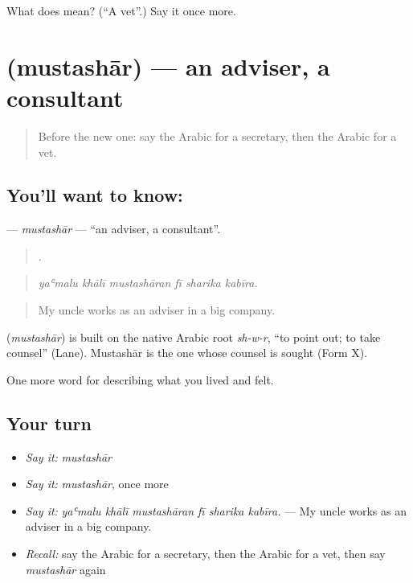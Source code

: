 \begin{tcolorbox}[breakable,colback=teal!4,colframe=teal!35!black,title={Before you move on}]
What does  mean? (\textquotedblleft{}A vet\textquotedblright{}.) Say it once more.
\end{tcolorbox}
\section[\texorpdfstring{\ar{مستشار} (mustashār)}{مستشار (mustashār)}]{ (mustashār) — an adviser, a consultant}

\label{lesson:AR-C518-mustashar}



\begin{quote}
Before the new one: say the Arabic for a secretary, then the Arabic for a vet.
\end{quote}

\subsection*{You'll want to know: }
\textbf{} — \emph{mustashār} — \textquotedblleft{}an adviser, a consultant\textquotedblright{}.

\begin{quote}
     .
\end{quote}

\begin{quote}
\emph{yaʿmalu khālī mustashāran fī sharika kabīra.}
\end{quote}

\begin{quote}
My uncle works as an adviser in a big company.
\end{quote}

\begin{cousinweb}
\textbf{} (\emph{mustashār}) is built on the native Arabic root \emph{sh-w-r}, \textquotedblleft{}to point out; to take counsel\textquotedblright{} (Lane). Mustashār is the one whose counsel is sought (Form X).
\end{cousinweb}

\begin{grammarlens}[title={What you've built}]
One more word for describing what you lived and felt.
\end{grammarlens}

\subsection*{Your turn}
\begin{itemize}
\raggedright
  \item \emph{Say it:} \emph{mustashār}
  \item \emph{Say it:} \emph{mustashār}, once more
  \item \emph{Say it:} \emph{yaʿmalu khālī mustashāran fī sharika kabīra.} — My uncle works as an adviser in a big company.
  \item \emph{Recall:} say the Arabic for a secretary, then the Arabic for a vet, then say \emph{mustashār} again
\end{itemize}

